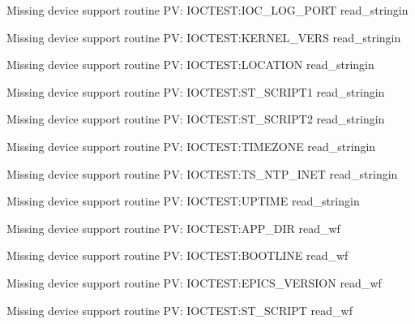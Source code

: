 Missing device support routine PV: IOCTEST:IOC_LOG_PORT read_stringin

Missing device support routine PV: IOCTEST:KERNEL_VERS read_stringin

Missing device support routine PV: IOCTEST:LOCATION read_stringin

Missing device support routine PV: IOCTEST:ST_SCRIPT1 read_stringin

Missing device support routine PV: IOCTEST:ST_SCRIPT2 read_stringin

Missing device support routine PV: IOCTEST:TIMEZONE read_stringin

Missing device support routine PV: IOCTEST:TS_NTP_INET read_stringin

Missing device support routine PV: IOCTEST:UPTIME read_stringin

Missing device support routine PV: IOCTEST:APP_DIR read_wf

Missing device support routine PV: IOCTEST:BOOTLINE read_wf

Missing device support routine PV: IOCTEST:EPICS_VERSION read_wf

Missing device support routine PV: IOCTEST:ST_SCRIPT read_wf

